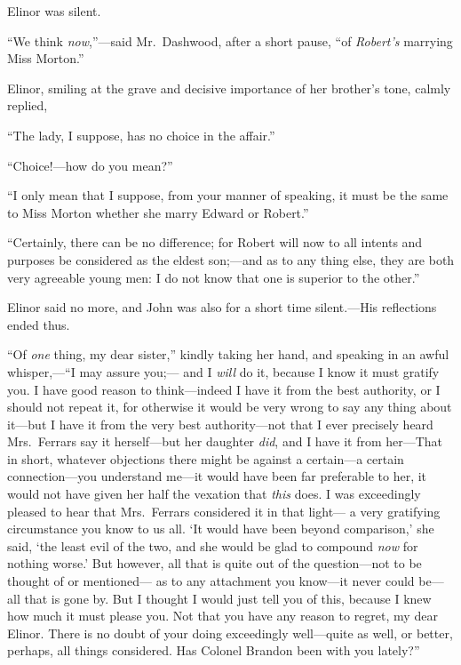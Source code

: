Elinor was silent.

``We think \emph{now},''---said Mr.\ Dashwood, after a short pause,
``of \emph{Robert's} marrying Miss Morton.''

Elinor, smiling at the grave and decisive importance
of her brother's tone, calmly replied,

``The lady, I suppose, has no choice in the affair.''

``Choice!---how do you mean?''

``I only mean that I suppose, from your manner
of speaking, it must be the same to Miss Morton whether
she marry Edward or Robert.''

``Certainly, there can be no difference; for Robert
will now to all intents and purposes be considered
as the eldest son;---and as to any thing else, they are
both very agreeable young men: I do not know that one
is superior to the other.''

Elinor said no more, and John was also for a short
time silent.---His reflections ended thus.

``Of \emph{one} thing, my dear sister,'' kindly taking her hand,
and speaking in an awful whisper,---``I may assure you;---%
and I \emph{will} do it, because I know it must gratify you.
I have good reason to think---indeed I have it from the
best authority, or I should not repeat it, for otherwise
it would be very wrong to say any thing about it---but
I have it from the very best authority---not that I ever
precisely heard Mrs.\ Ferrars say it herself---but her
daughter \emph{did}, and I have it from her---That in short,
whatever objections there might be against a certain---a
certain connection---you understand me---it would have been
far preferable to her, it would not have given her half
the vexation that \emph{this} does.  I was exceedingly pleased
to hear that Mrs.\ Ferrars considered it in that light---%
a very gratifying circumstance you know to us all.
`It would have been beyond comparison,' she said, `the least
evil of the two, and she would be glad to compound \emph{now}
for nothing worse.' But however, all that is quite out
of the question---not to be thought of or mentioned---%
as to any attachment you know---it never could be---all
that is gone by.  But I thought I would just tell you
of this, because I knew how much it must please you.
Not that you have any reason to regret, my dear Elinor.  There
is no doubt of your doing exceedingly well---quite as well,
or better, perhaps, all things considered.  Has Colonel
Brandon been with you lately?''

